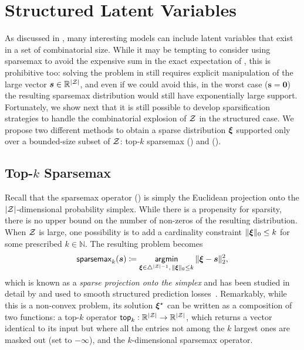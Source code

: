 \section{\label{sec:structured}Structured Latent Variables}

\noindent As discussed in , many interesting models
can include latent variables that exist in a set of combinatorial
size. While it may be tempting to consider using sparsemax to avoid
the expensive sum in the exact expectation of , this
is prohibitive too: solving the problem in 
still requires explicit manipulation of the large vector $\bm{s} \in
    \mathbb{R}^{|\mathcal{Z}|}$, and even if we could avoid this, in the worst
case ($\bm{s}=\bm{0}$) the resulting sparsemax distribution would
still have exponentially large support. Fortunately, we show next
that it is still possible to develop sparsification strategies to
handle the combinatorial explosion of $\mathcal{Z}$ in the structured case.
We propose two different methods to obtain a sparse distribution
$\bm{\xi}$ supported only over a bounded-size subset of $\mathcal{Z}$: top-$k$
sparsemax () and \smap ().

\subsection{\label{sec:topksparse}\texorpdfstring{Top-{\boldmath $k$}}{Top-k} Sparsemax}

\noindent Recall that the sparsemax operator () is simply
the Euclidean projection onto the $|\mathcal{Z}|$-dimensional probability
simplex. While there is a propensity for sparsity, there is no upper
bound on the number of non-zeros of the resulting distribution. When
$\mathcal{Z}$ is large, one possibility is to add a cardinality constraint
$\|\bm{\xi}\|_0 \le k$ for some prescribed $k \in \mathbb{N}$. The
resulting problem becomes
%
\begin{equation}\label{eq:topk_sparsemax}
    \operatorname{\mathsf{sparsemax}_\text{$k$}}(\bm{s}) \coloneqq
    \operatorname*{\mathsf{argmin}}_{\bm{\xi} \in \triangle^{|\mathcal{Z}|-1}, \, \|\bm{\xi}\|_0 \le k} \| \bm{\xi} - \bm{s} \|_2^2,
\end{equation}
%
which is known as a \emph{sparse projection onto the simplex} and has
been studied in detail by \citet{kyrillidis2013sparse} and used to
smooth structured prediction
losses~\citep{NIPS2018_7726,blondel2020}. Remarkably, while this is a
non-convex problem, its solution $\bm{\xi}^\star$ can be written as a
composition of two functions: a top-$k$ operator $\operatorname{\mathsf{top}_\text{$k$}}:
    \mathbb{R}^{|\mathcal{Z}|} \rightarrow \mathbb{R}^{|\mathcal{Z}|}$, which returns a
vector identical to its input but where all the entries not among the
$k$ largest ones are masked out (set to $-\infty$), and the
$k$-dimensional sparsemax operator.


